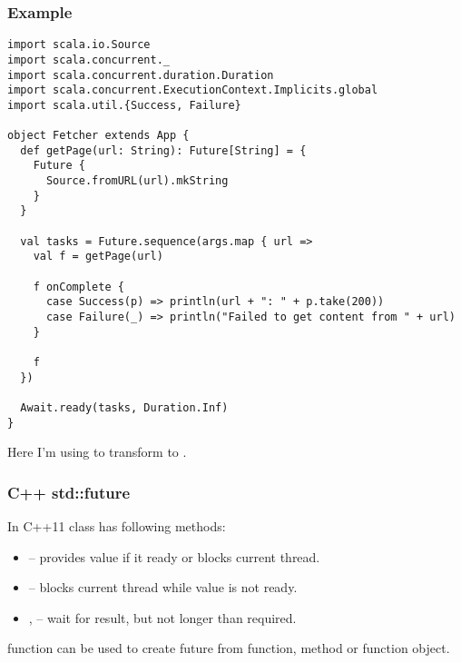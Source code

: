 \documentclass[t]{beamer}
\begin{document}
\begin{frame}[fragile]
\frametitle{Example}
\begin{lstlisting}
import scala.io.Source
import scala.concurrent._
import scala.concurrent.duration.Duration
import scala.concurrent.ExecutionContext.Implicits.global
import scala.util.{Success, Failure}

object Fetcher extends App {
  def getPage(url: String): Future[String] = {
    Future {
      Source.fromURL(url).mkString
    }
  }

  val tasks = Future.sequence(args.map { url =>
    val f = getPage(url)

    f onComplete {
      case Success(p) => println(url + ": " + p.take(200))
      case Failure(_) => println("Failed to get content from " + url)
    }

    f
  })

  Await.ready(tasks, Duration.Inf)
}
\end{lstlisting}

Here I'm using  to transform  to
.
\end{frame}

\begin{frame}[fragile]
\frametitle{C++ std::future}
In C++11  class has following methods:
\begin{itemize}
\item {} -- provides value if it ready or blocks current thread.
\item {} -- blocks current thread while value is not ready.
\item {},  -- wait for result, but not longer than
required.
\end{itemize}
 function can be used to create future from function, method or function object.
\end{frame}
\end{document}
